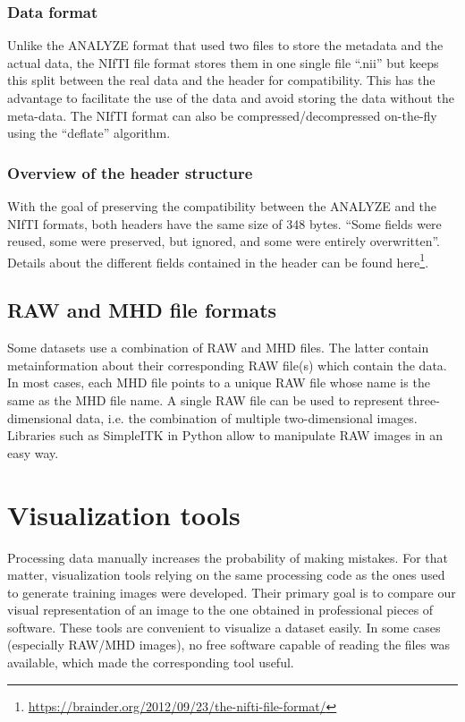 \subsubsection{Data format}
Unlike the ANALYZE format that used two files to store the metadata and the actual data, the NIfTI file format stores them in one single file “.nii” but keeps this split between the real data and the header for compatibility. This has the advantage to facilitate the use of the data and avoid storing the data without the meta-data. The NIfTI format can also be compressed/decompressed on-the-fly using the “deflate”  algorithm.


\subsubsection{Overview of the header structure}
With the goal of preserving the compatibility between the ANALYZE and the NIfTI formats, both headers have the same size of 348 bytes. “Some fields were reused, some were preserved, but ignored, and some were entirely overwritten”. Details about the different fields contained in the header can be found here\footnote{\url{https://brainder.org/2012/09/23/the-nifti-file-format/}}.


\subsection{RAW and MHD file formats}

Some datasets use a combination of RAW and MHD files. The latter contain metainformation about their corresponding RAW file(s) which contain the data. In most cases, each MHD file points to a unique RAW file whose name is the same as the MHD file name. A single RAW file can be used to represent three-dimensional data, i.e. the combination of multiple two-dimensional images. Libraries such as \mbox{SimpleITK} in Python allow to manipulate RAW images in an easy way. 



\section{Visualization tools}
Processing data manually increases the probability of making mistakes. For that matter, visualization tools relying on the same processing code as the ones used to generate training images were developed. Their primary goal is to compare our visual representation of an image to the one obtained in professional pieces of software. These tools are convenient to visualize a dataset easily. In some cases (especially RAW/MHD images), no free software capable of reading the files was available, which made the corresponding tool useful. 



